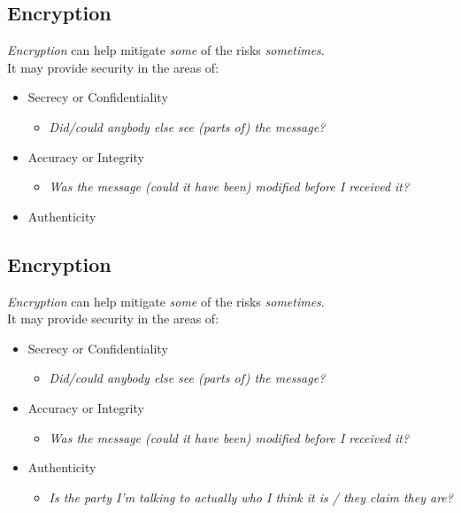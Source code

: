 \documentclass[xga]{xdvislides}
\begin{document}
\subsection{Encryption}
{\em Encryption} can help mitigate {\em some} of the risks {\em sometimes}.
\\

It may provide security in the areas of:
\begin{itemize}
	\item Secrecy or Confidentiality
		\begin{itemize}
			\item {\em Did/could anybody else see (parts of) the message?}
		\end{itemize}
	\item Accuracy or Integrity
		\begin{itemize}
			\item {\em Was the message (could it have been) modified before I received it?}
		\end{itemize}
	\item Authenticity
\end{itemize}

\subsection{Encryption}
{\em Encryption} can help mitigate {\em some} of the risks {\em sometimes}.
\\

It may provide security in the areas of:
\begin{itemize}
	\item Secrecy or Confidentiality
		\begin{itemize}
			\item {\em Did/could anybody else see (parts of) the message?}
		\end{itemize}
	\item Accuracy or Integrity
		\begin{itemize}
			\item {\em Was the message (could it have been) modified before I received it?}
		\end{itemize}
	\item Authenticity
		\begin{itemize}
			\item {\em Is the party I'm talking to actually
who I think it is / they claim they are?}
		\end{itemize}
\end{itemize}
\end{document}
